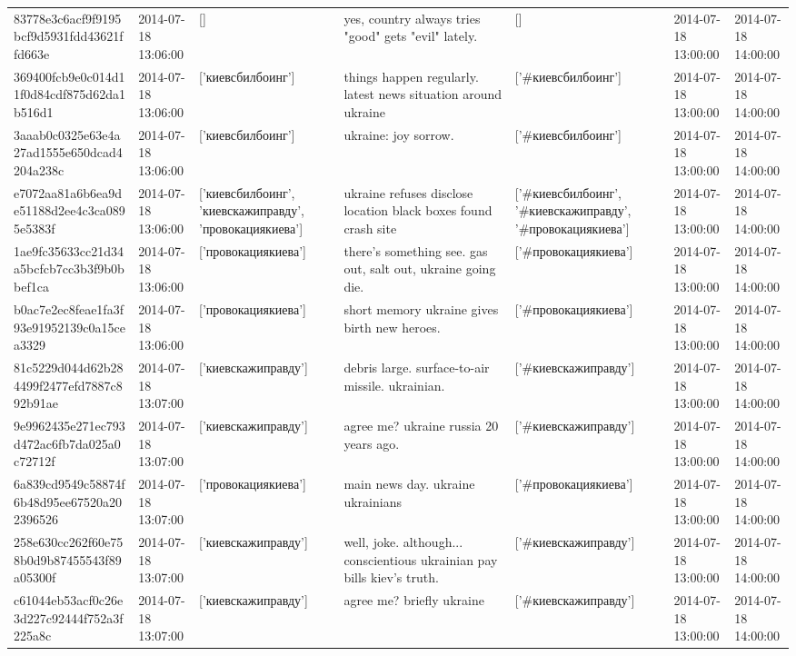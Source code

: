 \begin{tabular}{lllllll}
83778e3c6acf9f9195bcf9d5931fdd43621ffd663e & 2014-07-18 13:06:00 & [] & yes, country always tries "good" gets "evil" lately. & [] & 2014-07-18 13:00:00 & 2014-07-18 14:00:00 \\
369400fcb9e0c014d11f0d84cdf875d62da1b516d1 & 2014-07-18 13:06:00 & ['киевсбилбоинг'] & things happen regularly. latest news situation around ukraine & ['#киевсбилбоинг'] & 2014-07-18 13:00:00 & 2014-07-18 14:00:00 \\
3aaab0c0325e63e4a27ad1555e650dcad4204a238c & 2014-07-18 13:06:00 & ['киевсбилбоинг'] & ukraine: joy sorrow. & ['#киевсбилбоинг'] & 2014-07-18 13:00:00 & 2014-07-18 14:00:00 \\
e7072aa81a6b6ea9de51188d2ee4c3ca0895e5383f & 2014-07-18 13:06:00 & ['киевсбилбоинг', 'киевскажиправду', 'провокациякиева'] & ukraine refuses disclose location black boxes found crash site & ['#киевсбилбоинг', '#киевскажиправду', '#провокациякиева'] & 2014-07-18 13:00:00 & 2014-07-18 14:00:00 \\
1ae9fc35633cc21d34a5bcfcb7cc3b3f9b0bbef1ca & 2014-07-18 13:06:00 & ['провокациякиева'] & there's something see. gas out, salt out, ukraine going die. & ['#провокациякиева'] & 2014-07-18 13:00:00 & 2014-07-18 14:00:00 \\
b0ac7e2ec8feae1fa3f93e91952139c0a15cea3329 & 2014-07-18 13:06:00 & ['провокациякиева'] & short memory ukraine gives birth new heroes. & ['#провокациякиева'] & 2014-07-18 13:00:00 & 2014-07-18 14:00:00 \\
81c5229d044d62b284499f2477efd7887c892b91ae & 2014-07-18 13:07:00 & ['киевскажиправду'] & debris large. surface-to-air missile. ukrainian. & ['#киевскажиправду'] & 2014-07-18 13:00:00 & 2014-07-18 14:00:00 \\
9e9962435e271ec793d472ac6fb7da025a0c72712f & 2014-07-18 13:07:00 & ['киевскажиправду'] & agree me? ukraine russia 20 years ago. & ['#киевскажиправду'] & 2014-07-18 13:00:00 & 2014-07-18 14:00:00 \\
6a839cd9549c58874f6b48d95ee67520a202396526 & 2014-07-18 13:07:00 & ['провокациякиева'] & main news day. ukraine ukrainians & ['#провокациякиева'] & 2014-07-18 13:00:00 & 2014-07-18 14:00:00 \\
258e630cc262f60e758b0d9b87455543f89a05300f & 2014-07-18 13:07:00 & ['киевскажиправду'] & well, joke. although... conscientious ukrainian pay bills kiev's truth. & ['#киевскажиправду'] & 2014-07-18 13:00:00 & 2014-07-18 14:00:00 \\
c61044eb53acf0c26e3d227c92444f752a3f225a8c & 2014-07-18 13:07:00 & ['киевскажиправду'] & agree me? briefly ukraine & ['#киевскажиправду'] & 2014-07-18 13:00:00 & 2014-07-18 14:00:00 \\

\end{tabular}
